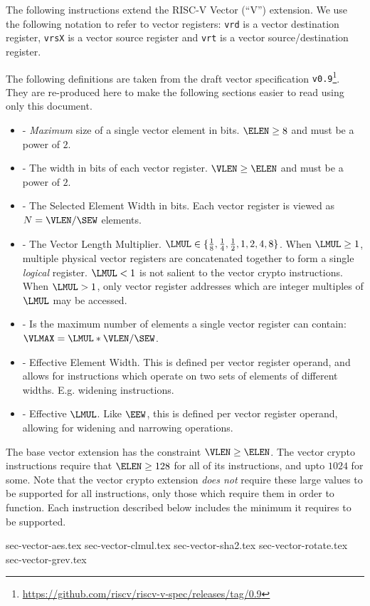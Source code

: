 
The following instructions extend the RISC-V Vector (``V'') extension.
We use the following notation to refer to vector registers:
{\tt vrd}  is a vector        destination register,
{\tt vrsX} is a vector source             register
and
{\tt vrt}  is a vector source/destination register.

The following definitions are taken from the draft
vector specification {\tt v0.9}\footnote{\url{https://github.com/riscv/riscv-v-spec/releases/tag/0.9}}.
They are re-produced here to make the following sections easier to
read using only this document.

\begin{itemize}
\item[\ELEN] - {\em Maximum} size of a single vector element in bits.
              $\ELEN \ge 8$ and must be a power of $2$.
\item[\VLEN] - The width in bits of each vector register.
              $\VLEN \ge \ELEN$ and must be a power of $2$.
\item[\SEW]  - The Selected Element Width in bits.
              Each vector register is viewed as $N=\VLEN/\SEW$ elements.
\item[\LMUL] - The Vector Length Multiplier.
              $\LMUL\in\{{1\over 8},{1\over 4},{1\over 2},1,2,4,8\}$.
              When $\LMUL\ge1$, multiple physical vector registers are
              concatenated together to form a single {\em logical} register.
              $\LMUL<1$ is not salient to the vector crypto instructions.
              When $\LMUL>1$, only vector register addresses which are
              integer multiples of $\LMUL$ may be accessed.
\item[\VLMAX]- Is the maximum number of elements a single vector register
              can contain: $\VLMAX=\LMUL*\VLEN/\SEW$.
\item[\EEW]  - Effective Element Width. This is defined per vector register
              operand, and allows for instructions which operate on
              two sets of elements of different widths. E.g. widening
              instructions.
\item[\EMUL] - Effective $\LMUL$. Like $\EEW$, this is defined per vector
              register operand, allowing for widening and narrowing
              operations.
\end{itemize}

The base vector extension has the constraint $\VLEN \ge \ELEN$.
The vector crypto instructions require that $\ELEN \ge 128$ for all
of its instructions, and upto $1024$ for some.
Note that the vector crypto extension {\em does not} require these
large \ELEN values to be supported for all instructions, only those
which require them in order to function.
Each instruction described below includes the minimum \ELEN it
requires to be supported.


{sec-vector-aes.tex}
{sec-vector-clmul.tex}
{sec-vector-sha2.tex}
{sec-vector-rotate.tex}
{sec-vector-grev.tex}


